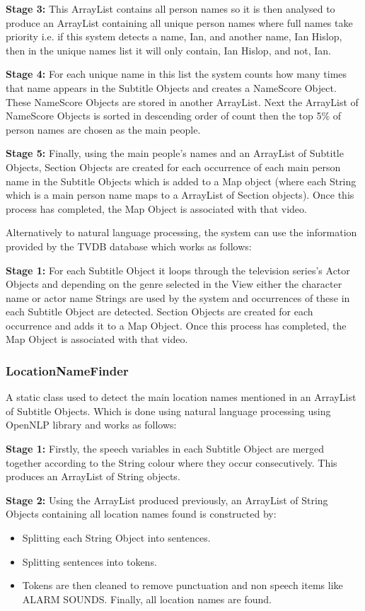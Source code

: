 \textbf{Stage 3:} This ArrayList contains all person names so it is then analysed to produce an ArrayList containing all unique person names where full names take priority i.e. if this system detects a name, Ian, and another name, Ian Hislop, then in the unique names list it will only contain, Ian Hislop, and not, Ian.

\textbf{Stage 4:} For each unique name in this list the system counts how many times that name appears in the Subtitle Objects and creates a NameScore Object. These NameScore Objects are stored in another ArrayList. Next the ArrayList of NameScore Objects is sorted in descending order of count then the top 5\% of person names are chosen as the main people. 

\textbf{Stage 5:} Finally, using the main people's names and an ArrayList of Subtitle Objects, Section Objects are created for each occurrence of each main person name in the Subtitle Objects which is added to a Map object (where each String which is a main person name maps to a ArrayList of Section objects). Once this process has completed, the Map Object is associated with that video.

Alternatively to natural language processing, the system can use the information provided by the TVDB database which works as follows:

\textbf{Stage 1:} For each Subtitle Object it loops through the television series's Actor Objects and depending on the genre selected in the 
View either the character name or actor name Strings are used by the system and occurrences of these in each Subtitle Object are detected. 
Section Objects are created for each occurrence and adds it to a Map Object. Once this process has completed, the Map Object is associated 
with that video.

\subsubsection{LocationNameFinder}
A static class used to detect the main location names mentioned in an ArrayList of Subtitle Objects. Which is done using natural language processing using OpenNLP library \cite{nlp} and works as follows:

\textbf{Stage 1:} Firstly, the speech variables in each Subtitle Object are merged together according to the String colour where they occur consecutively. This produces an ArrayList of String objects.

\textbf{Stage 2:} Using the ArrayList produced previously, an ArrayList of String Objects containing all location names found is constructed by:
\begin{itemize}
	\item{Splitting each String Object into sentences.}
	\item{Splitting sentences into tokens.}
	\item{Tokens are then cleaned to remove punctuation and non speech items like ALARM SOUNDS. Finally, all location names are found.}
\end{itemize}

